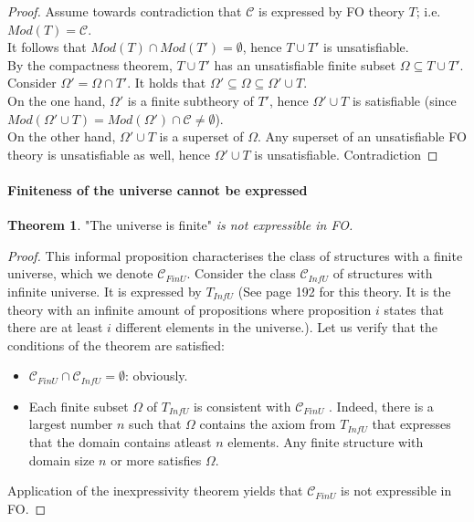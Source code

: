 \documentclass[10pt,a4paper]{article}
\theoremstyle{definition}
\newtheorem{theorem}{Theorem}
\begin{document}
\begin{proof}
Assume towards contradiction that $\mathcal{C}$ is expressed by FO theory $T$; i.e. $Mod(T) = \mathcal{C}$.\\

It follows that $Mod(T) \cap Mod(T') = \emptyset$, hence $T \cup T'$ is unsatisfiable.\\

By the compactness theorem, $T \cup T'$ has an unsatisfiable finite subset $\Omega \subseteq T \cup T'$.\\

Consider $\Omega' = \Omega \cap T'$. It holds that $\Omega' \subseteq \Omega \subseteq \Omega' \cup T$.\\

On the one hand, $\Omega'$ is a finite subtheory of $T'$, hence $\Omega' \cup T$ is satisfiable (since $Mod(\Omega' \cup T) = Mod(\Omega') \cap \mathcal{C} \neq \emptyset$).\\

On the other hand, $\Omega' \cup T$ is a superset of $\Omega$. Any superset of an unsatisfiable FO theory is unsatisfiable as well, hence $\Omega' \cup T$ is unsatisfiable. Contradiction
\end{proof}

\paragraph{Finiteness of the universe cannot be expressed}
\begin{theorem}
"The universe is finite" \textit{is not expressible in FO.}
\end{theorem}

\begin{proof}
This informal proposition characterises the class of structures with a finite universe, which
we denote $\mathcal{C}_{FinU}$. Consider the class $\mathcal{C}_{InfU}$ of structures with infinite universe. It is expressed by $T_{InfU}$ (See page 192 for this theory. It is the theory with an infinite amount of propositions where proposition $i$ states that there are at least $i$ different elements in the universe.). Let us verify that the conditions of the theorem are satisfied:
\begin{itemize}
	\item $\mathcal{C}_{FinU} \cap \mathcal{C}_{InfU} = \emptyset$: obviously.
	\item Each finite subset $\Omega$ of $T_{InfU}$ is consistent with $\mathcal{C}_{FinU}$ . Indeed, there is a largest number $n$ such that $\Omega$ contains the axiom from $T_{InfU}$ that expresses that the domain contains atleast $n$ elements. Any finite structure with domain size $n$ or more satisfies $\Omega$.
\end{itemize}
Application of the inexpressivity theorem yields that $\mathcal{C}_{FinU}$ is not expressible in FO.

\end{proof}
\end{document}

